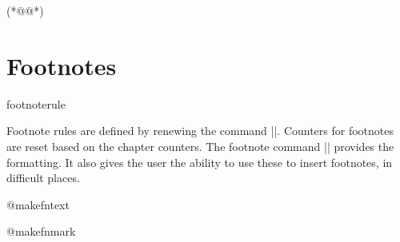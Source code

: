 \begin{teX}
\newenvironment{theindex}
   {\if@twocolumn
      \@restonecolfalse
      \else
         \@restonecoltrue
      \fi
      \twocolumn[\@makeschapterhead{\indexname}]%
      \@mkboth{\MakeUppercase\indexname}%
              {\MakeUppercase\indexname}%
                \thispagestyle{plain}\parindent\z@
                \parskip\z@ \@plus .3\p@\relax
                \columnseprule \z@
                \columnsep 35\p@
                \let\item\@idxitem}
      {\if@restonecol\onecolumn\else\clearpage\fi}
\newcommand\@idxitem{\par\hangindent 40\p@} (*@\label{idxitem}@*)
\newcommand\subitem{\@idxitem \hspace*{20\p@}}
\newcommand\subsubitem{\@idxitem \hspace*{30\p@}}
\newcommand\indexspace{\par \vskip 10\p@ \@plus5\p@ \@minus3\p@\relax}
\end{teX}

\section{Footnotes}
\label{book:footnotes}


\begin{docCommand}{footnoterule}{}

 Footnote rules are defined by renewing the command |\footnoterule|. Counters for footnotes are reset based on the chapter counters. The footnote command |\@makefntext| provides the formatting. It also gives the user the ability to use these to insert footnotes, in difficult places.
\end{docCommand}




\begin{teX}
\renewcommand\footnoterule{%
  \kern-3\p@
  \hrule\@width.4\columnwidth 
  \kern2.6\p@}

\end{teX}

\begin{docCommand}{@makefntext}{}
\end{docCommand}

\begin{docCommand}{@makefnmark}{}
\end{docCommand}


